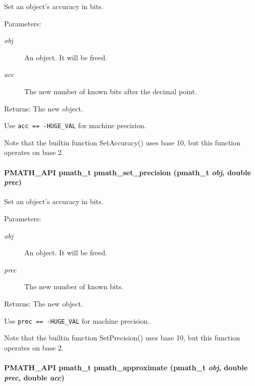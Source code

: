 Set an object's accuracy in bits. 

\begin{Desc}
\item[Parameters:]
\begin{description}
\item[{\em obj}]An object. It will be freed. \item[{\em acc}]The new number of known bits after the decimal point. \end{description}
\end{Desc}
\begin{Desc}
\item[Returns:]The new object.\end{Desc}
Use {\tt acc == -HUGE\_\-VAL} for machine precision.

Note that the builtin function SetAccuracy() uses base 10, but this function operates on base 2. \hypertarget{group__numbers_g6e44e92e81d1b30567b58568e0151e2c}{
\paragraph[{pmath\_\-set\_\-precision}]{\setlength{\rightskip}{0pt plus 5cm}PMATH\_\-API {\bf pmath\_\-t} pmath\_\-set\_\-precision ({\bf pmath\_\-t} {\em obj}, \/  double {\em prec})}\hfill}
\label{group__numbers_g6e44e92e81d1b30567b58568e0151e2c}


Set an object's accuracy in bits. 

\begin{Desc}
\item[Parameters:]
\begin{description}
\item[{\em obj}]An object. It will be freed. \item[{\em prec}]The new number of known bits. \end{description}
\end{Desc}
\begin{Desc}
\item[Returns:]The new object.\end{Desc}
Use {\tt prec == -HUGE\_\-VAL} for machine precision.

Note that the builtin function SetPrecision() uses base 10, but this function operates on base 2. \hypertarget{group__numbers_g40f6a60efe25a7a13630d2d51911dc27}{
\paragraph[{pmath\_\-approximate}]{\setlength{\rightskip}{0pt plus 5cm}PMATH\_\-API {\bf pmath\_\-t} pmath\_\-approximate ({\bf pmath\_\-t} {\em obj}, \/  double {\em prec}, \/  double {\em acc})}\hfill}
\label{group__numbers_g40f6a60efe25a7a13630d2d51911dc27}


